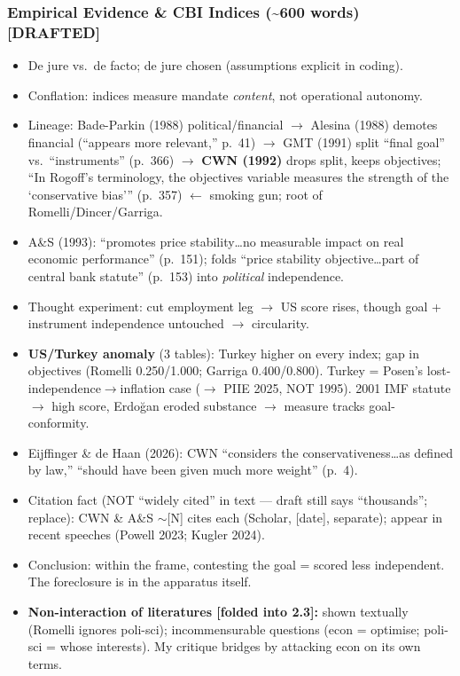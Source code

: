 \documentclass[12pt,a4paper]{article}
\begin{document}
\begin{doublespace}
\subsubsection{Empirical Evidence \& CBI Indices (\textasciitilde600 words) [DRAFTED]}
\begin{itemize}
    \item De jure vs.\ de facto; de jure chosen (assumptions explicit in coding).
    \item Conflation: indices measure mandate \textit{content}, not operational autonomy.
    \item Lineage: Bade-Parkin (1988) political/financial $\rightarrow$ Alesina (1988) demotes financial (``appears more relevant,'' p.\ 41) $\rightarrow$ GMT (1991) split ``final goal'' vs.\ ``instruments'' (p.\ 366) $\rightarrow$ \textbf{CWN (1992)} drops split, keeps objectives; ``In Rogoff's terminology, the objectives variable measures the strength of the `conservative bias''' (p.\ 357) $\leftarrow$ smoking gun; root of Romelli/Dincer/Garriga.
    \item A\&S (1993): ``promotes price stability\ldots no measurable impact on real economic performance'' (p.\ 151); folds ``price stability objective\ldots part of central bank statute'' (p.\ 153) into \textit{political} independence.
    \item Thought experiment: cut employment leg $\rightarrow$ US score rises, though goal + instrument independence untouched $\rightarrow$ circularity.
    \item \textbf{US/Turkey anomaly} (3 tables): Turkey higher on every index; gap in objectives (Romelli 0.250/1.000; Garriga 0.400/0.800). Turkey = Posen's lost-independence$\rightarrow$inflation case ($\rightarrow$ PIIE 2025, NOT 1995). 2001 IMF statute $\rightarrow$ high score, Erdo\u{g}an eroded substance $\rightarrow$ measure tracks goal-conformity.
    \item Eijffinger \& de Haan (2026): CWN ``considers the conservativeness\ldots as defined by law,'' ``should have been given much more weight'' (p.\ 4).
    \item Citation fact (NOT ``widely cited'' in text --- draft still says ``thousands''; replace): CWN \& A\&S $\sim$[N] cites each (Scholar, [date], separate); appear in recent speeches (Powell 2023; Kugler 2024).
    \item Conclusion: within the frame, contesting the goal = scored less independent. The foreclosure is in the apparatus itself.
    \item \textbf{Non-interaction of literatures [folded into 2.3]:} shown textually (Romelli ignores poli-sci); incommensurable questions (econ = optimise; poli-sci = whose interests). My critique bridges by attacking econ on its own terms.
\end{itemize}


\end{doublespace}
\end{document}

